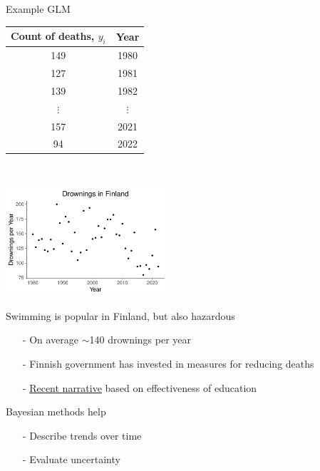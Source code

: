 \documentclass[finnish,english,t]{beamer}
\begin{document}
\begin{frame}{Example GLM}

{\footnotesize\vspace{-1mm}
    \begin{tabular}{c c}
      \vspace{-1mm} Count of deaths, $y_i$ & Year \\
      \hline \vspace{-1mm}
      149 & 1980 \\ \vspace{-1mm}
      127 & 1981 \\ \vspace{-1mm}
      139 & 1982 \\ \vspace{-1mm}
       $\vdots$ & $\vdots$ \\ \vspace{-1mm}
       157 & 2021 \\ \vspace{-1mm}
       94 & 2022
       
    \end{tabular}
  }~\parbox[t][2cm][b]{3.5cm}{\includegraphics[width=6cm]{figs/drownings_plot.pdf}}
  \vspace{2mm}
  \pause

  \vspace{-\baselineskip}
  Swimming is popular in Finland, but also hazardous 
    \begin{itemize}
      \item[-] On average $\sim$140 drownings per year
      \item[-] Finnish government has invested in measures for reducing deaths
      \item[-] \href{https://yle.fi/a/74-20048960}{Recent narrative} based on effectiveness of education 
      \end{itemize}
      
  \pause
   Bayesian methods help
    \begin{itemize}
    \item[-] Describe trends over time
    \item[-] Evaluate uncertainty
    \end{itemize}

\end{frame}
\end{document}
